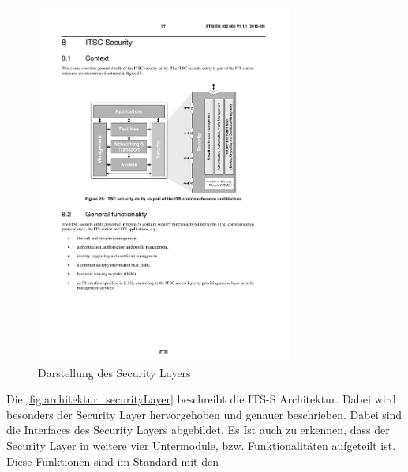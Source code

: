 \begin{figure}
	\includegraphics[width=0.75\textwidth]{content/images/02_architektur/securityLayer.pdf}
	\caption{Darstellung des Security Layers \cite{en302665}}
	\label{fig:architektur_securityLayer}
\end{figure}


Die \autoref{fig:architektur_securityLayer}  beschreibt die \ac{ITS-S} Architektur. Dabei wird besonders der Security Layer hervorgehoben und genauer beschrieben. Dabei sind die Interfaces des Security Layers abgebildet. Es Ist auch zu erkennen, dass der Security Layer in weitere vier Untermodule, bzw. Funktionalitäten aufgeteilt ist. Diese Funktionen sind im Standard \cite{ts102940} mit den 

